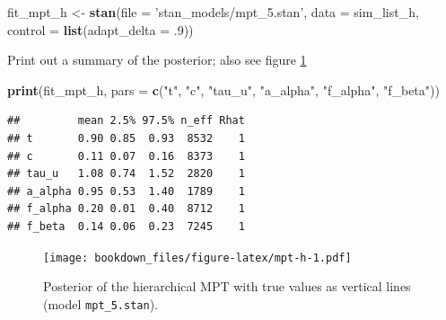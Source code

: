 \documentclass[12pt,]{krantz}
\newenvironment{Shaded}{\begin{snugshade}}{\end{snugshade}}
\newcommand{\KeywordTok}[1]{\textcolor[rgb]{0.13,0.29,0.53}{\textbf{#1}}}
\newcommand{\DataTypeTok}[1]{\textcolor[rgb]{0.13,0.29,0.53}{#1}}
\newcommand{\FloatTok}[1]{\textcolor[rgb]{0.00,0.00,0.81}{#1}}
\newcommand{\StringTok}[1]{\textcolor[rgb]{0.31,0.60,0.02}{#1}}
\newcommand{\OperatorTok}[1]{\textcolor[rgb]{0.81,0.36,0.00}{\textbf{#1}}}
\newcommand{\NormalTok}[1]{#1}
\theoremstyle{definition}
\theoremstyle{definition}
\theoremstyle{definition}
\theoremstyle{remark}
\begin{document}
\begin{Shaded}
\begin{Highlighting}[]
\NormalTok{fit_mpt_h <-}\StringTok{ }\KeywordTok{stan}\NormalTok{(}\DataTypeTok{file =} \StringTok{'stan_models/mpt_5.stan'}\NormalTok{, }
              \DataTypeTok{data =}\NormalTok{ sim_list_h, }
              \DataTypeTok{control =} \KeywordTok{list}\NormalTok{(}\DataTypeTok{adapt_delta =} \FloatTok{.9}\NormalTok{))  }
\end{Highlighting}
\end{Shaded}

Print out a summary of the posterior; also see figure \ref{fig:mpt-h}

\begin{Shaded}
\begin{Highlighting}[]
\KeywordTok{print}\NormalTok{(fit_mpt_h, }\DataTypeTok{pars =} \KeywordTok{c}\NormalTok{(}\StringTok{"t"}\NormalTok{, }\StringTok{"c"}\NormalTok{, }\StringTok{"tau_u"}\NormalTok{, }\StringTok{"a_alpha"}\NormalTok{, }\StringTok{"f_alpha"}\NormalTok{, }\StringTok{"f_beta"}\NormalTok{))}
\end{Highlighting}
\end{Shaded}

\begin{verbatim}
##         mean 2.5% 97.5% n_eff Rhat
## t       0.90 0.85  0.93  8532    1
## c       0.11 0.07  0.16  8373    1
## tau_u   1.08 0.74  1.52  2820    1
## a_alpha 0.95 0.53  1.40  1789    1
## f_alpha 0.20 0.01  0.40  8712    1
## f_beta  0.14 0.06  0.23  7245    1
\end{verbatim}

\begin{Shaded}
\end{Shaded}

\begin{figure}
\centering
\texttt{[image: bookdown\_files/figure-latex/mpt-h-1.pdf]}
\caption{\label{fig:mpt-h}Posterior of the hierarchical MPT with true values
as vertical lines (model \texttt{mpt\_5.stan}).}
\end{figure}
\end{document}
